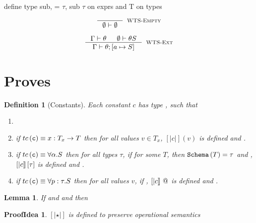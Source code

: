\documentclass[10pt,a4paper]{article}
\newcommand\highlight[2]{{\setlength\fboxsep{1pt}\colorbox{#1}{#2}}}
\def\NV{\highlight{colorNV}}
\newtheorem{lemma}{Lemma}
\newtheorem{definition}{Definition}
\newtheorem*{proofIdea}{ProofIdea}
\begin{document}
\begin{comment}
$$
\inference{
	\isWellFormed{\Gamma}{\rho} && \evalstar{\rho e}{true}
}{
	\isWellFormed{\Gamma; e}{\rho}
}[\wsGxt]
$$
\end{comment}



\NV{define type sub,  = $\tau$, sub $\tau$ on exprs and T on types}\\

\hfill\fbox{\isWellFormed{\Gamma}{\theta}}

$$
\inference{
}{
	\isWellFormed{\emptyset}{\emptyset}
}[\wstEmp]
$$

$$
\inference{
	\isWellFormed{\Gamma}{\theta} && \isWellFormed{\emptyset}{\theta S}
}{
	\isWellFormed{\Gamma}{\theta;\sub{a}{S}}
}[\wstExt]
$$


\section*{Proves}

\begin{definition}[Constants]
\label{DefConstants}
Each constant $c$ has type , such that
\begin{enumerate}
\item {}
\item if $tc\left(\texttt{c}\right) \equiv x : T_x \rightarrow T$
	  then for all values $v \in T_x$, 
	  $[|c|](v)$ is defined and 
	  .
\item if $tc\left(\texttt{c}\right) \equiv \forall \alpha . S$
	  then for all types $\tau$, 
	  if for some $T$, then 
	  $\texttt{Schema}\left(T\right) = \tau$ and , 
	  ${[|c|]} \left[ {\tau}\right]$ is defined and 
	  .
\item if $tc\left(\texttt{c}\right) \equiv \forall p : \tau . S$
	  then for all values $v$, 
	  if ,
	  ${[|c|]} \ @$ is defined and 
	  .
\end{enumerate}
\end{definition}

\begin{lemma}
\label{LemEvalSub}
If  
and 
and 
then 
\end{lemma}
\begin{proofIdea}
$[| \star|]$ is defined to preserve operational semantics
\end{proofIdea}
\end{document}
